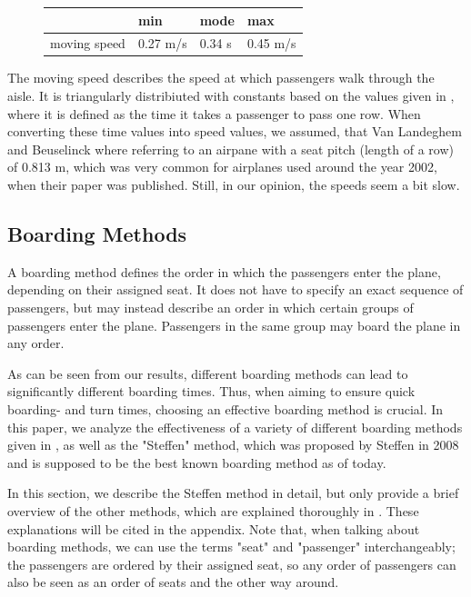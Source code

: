 \documentclass[11pt]{article}
\begin{document}
\begin{figure}[h!]
\begin{tabular}{l|l l l}

	&min &mode&max \\
	\hline
moving speed &0.27 m/s&0.34 s& 0.45 m/s   \\
	\hline
\end{tabular}
\end{figure}
The moving speed describes the speed at which passengers walk through the aisle. It is triangularly distribiuted with constants based on the values given in \cite{beus}, where it is defined as the time it takes a passenger to pass one row. When converting these time values into speed values, we assumed, that Van Landeghem and Beuselinck where referring to an airpane with a seat pitch (length of a row) of 0.813 m, which was very common for airplanes used around the year 2002, when their paper was published. Still, in our opinion, the speeds seem a bit slow.


\subsection{Boarding Methods}
A boarding method defines the order in which the passengers enter the plane, depending on their assigned seat. It does not have to specify an exact sequence of passengers, but may instead describe an order in which certain groups of passengers enter the plane. Passengers in the same group may board the plane in any order. 


As can be seen from our results, different boarding methods can lead to significantly different boarding times. Thus, when aiming to ensure quick boarding- and turn times, choosing an effective boarding method is crucial. In this paper, we analyze the effectiveness of a variety of different boarding methods given in \cite{beus}, as well as the "Steffen" method, which was proposed by Steffen \cite{steffen} in 2008 and is supposed to be the best known boarding method as of today.



In this section, we describe the Steffen method in detail, but only provide a brief overview of the other methods, which are explained thoroughly in \cite{beus}. These explanations will be cited in the appendix. Note that, when talking about boarding methods, we can use the terms "seat" and "passenger" interchangeably; the passengers are ordered by their assigned seat, so any order of passengers can also be seen as an order of seats and the other way around.
\end{document}
